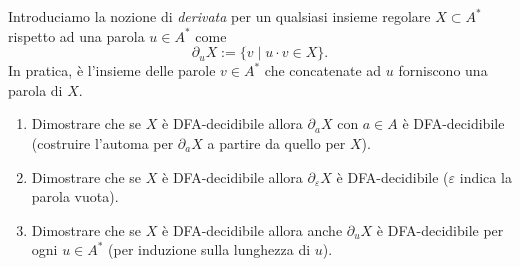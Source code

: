 
\begin{ex}
Introduciamo la nozione di \emph{derivata} per un qualsiasi insieme regolare $X\subset A^*$ rispetto ad una parola $u\in A^*$ come
\[
\partial_uX:=\{v\mid u\cdot v\in X\}.
\]
In pratica, è l'insieme delle parole $v\in A^*$ che concatenate ad $u$ forniscono una parola di $X$.
\begin{enumerate}
\item Dimostrare che se $X$ è DFA-decidibile allora $\partial_aX$ con $a\in A$ è DFA-decidibile (costruire l'automa per $\partial_aX$ a partire da quello per $X$).
\item Dimostrare che se $X$ è DFA-decidibile allora $\partial_\varepsilon X$ è DFA-decidibile ($\varepsilon$ indica la parola vuota).
\item Dimostrare che se $X$ è DFA-decidibile allora anche $\partial_uX$ è DFA-decidibile per ogni $u\in A^*$ (per induzione sulla lunghezza di $u$).
\end{enumerate}
\end{ex}

